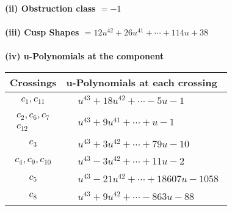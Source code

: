 \documentclass[1p]{elsarticle_modified}
\theoremstyle{definition}
\begin{document}
\flushleft \textbf{(ii) Obstruction class $= -1$}\\~\\
\flushleft \textbf{(iii) Cusp Shapes $= 12 u^{42}+26 u^{41}+\cdots+114 u+38$}\\~\\
\newpage\renewcommand{\arraystretch}{1}
\flushleft \textbf{(iv) u-Polynomials at the component}\newline \\
\begin{tabular}{m{50pt}|m{274pt}}
Crossings & \hspace{64pt}u-Polynomials at each crossing \\
\hline $$\begin{aligned}c_{1},c_{11}\end{aligned}$$&$\begin{aligned}
&u^{43}+18 u^{42}+\cdots-5 u-1
\end{aligned}$\\
\hline $$\begin{aligned}c_{2},c_{6},c_{7}\\c_{12}\end{aligned}$$&$\begin{aligned}
&u^{43}+9 u^{41}+\cdots+u-1
\end{aligned}$\\
\hline $$\begin{aligned}c_{3}\end{aligned}$$&$\begin{aligned}
&u^{43}+3 u^{42}+\cdots+79 u-10
\end{aligned}$\\
\hline $$\begin{aligned}c_{4},c_{9},c_{10}\end{aligned}$$&$\begin{aligned}
&u^{43}-3 u^{42}+\cdots+11 u-2
\end{aligned}$\\
\hline $$\begin{aligned}c_{5}\end{aligned}$$&$\begin{aligned}
&u^{43}-21 u^{42}+\cdots+18607 u-1058
\end{aligned}$\\
\hline $$\begin{aligned}c_{8}\end{aligned}$$&$\begin{aligned}
&u^{43}+9 u^{42}+\cdots-863 u-88
\end{aligned}$\\
\hline
\end{tabular}\\~\\
\end{document}
